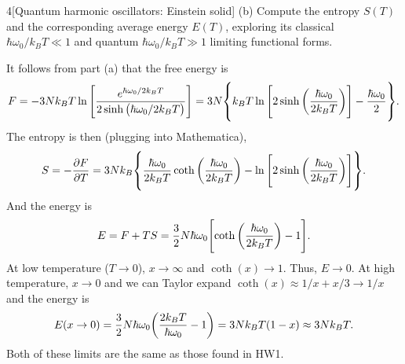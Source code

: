 \documentclass[12pt]{article}
\begin{document}
\begin{problem}{4}[Quantum harmonic oscillators: Einstein solid]
(b) Compute the entropy $S(T)$ and the corresponding average energy $E(T)$,
exploring its classical $\hbar\omega_0/k_BT\ll 1$ and quantum
$\hbar\omega_0/k_BT\gg 1$ limiting functional forms.

\begin{solution}
It follows from part (a) that the free energy is
\begin{equation}
    F=-3Nk_BT\ln\qty[\frac{e^{\hbar\omega_0/2k_BT}}{2\sinh\qty(\hbar\omega_0/2k_BT)}]
    =3N\qty{k_BT\ln\qty[2\sinh\qty(\frac{\hbar\omega_0}{2k_BT})]-\frac{\hbar\omega_0}{2}}.
\end{equation}
The entropy is then (plugging into Mathematica),
\begin{equation}
    S=-\frac{\partial F}{\partial T}
    =3Nk_B\qty{\frac{\hbar\omega_0}{2k_BT}\coth\qty(\frac{\hbar\omega_0}{2k_BT})-\ln\qty[2\sinh\qty(\frac{\hbar\omega_0}{2k_BT})]}.
\end{equation}
And the energy is
\begin{equation}
    E=F+TS
    =\frac32N\hbar\omega_0\qty[\coth\qty(\frac{\hbar\omega_0}{2k_BT})-1].
\end{equation}
At low temperature ($T\to0$), $x\to\infty$ and $\coth(x)\to1$. Thus, $E\to0$. At
high temperature, $x\to0$ and we can Taylor expand $\coth(x)\approx
1/x+x/3\to1/x$ and the energy is
\begin{equation}\label{p4b:E}
    E(x\to0)=\frac32N\hbar\omega_0\qty(\frac{2k_BT}{\hbar\omega_0}-1)
    =3Nk_BT\qty(1-x)\approx3Nk_BT.
\end{equation}
Both of these limits are the same as those found in HW1.
\end{solution}


\end{problem}
\end{document}
